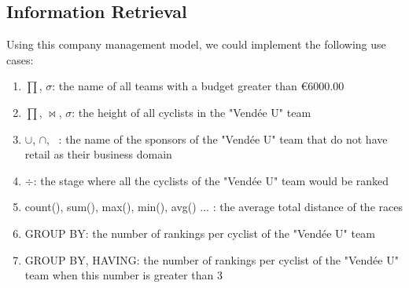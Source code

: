\subsection{Information Retrieval}
Using this company management model, we could implement the following use cases:
\begin{enumerate}
    \item $\prod$, $\sigma$: the name of all teams with a budget greater than €6000.00
    \item $\prod$, $\bowtie$, $\sigma$: the height of all cyclists in the "Vendée U" team
    \item $\cup$, $\cap$, \ : the name of the sponsors of the "Vendée U" team that do not have retail as their business domain
    \item $\div$: the stage where all the cyclists of the "Vendée U" team would be ranked
    \item count(), sum(), max(), min(), avg() ... : the average total distance of the races
    \item GROUP BY: the number of rankings per cyclist of the "Vendée U" team
    \item GROUP BY, HAVING: the number of rankings per cyclist of the "Vendée U" team when this number is greater than 3
\end{enumerate}
